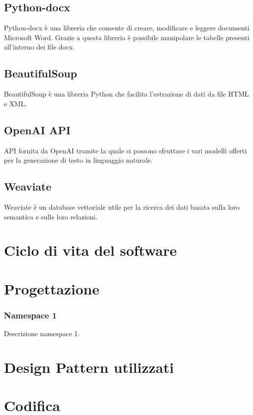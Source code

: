 \subsection{Python-docx}
Python-docx è una libreria che consente di creare, modificare e leggere documenti Microsoft Word.
Grazie a questa libreria è possibile manipolare le tabelle presenti all'interno dei file docx.
\subsection{BeautifulSoup}
BeautifulSoup è una libreria Python che facilita l'estrazione di dati da file HTML e XML.
\subsection{OpenAI API}
API fornita da OpenAI tramite la quale si possono sfruttare i vari modelli offerti per la generazione di testo in linguaggio naturale.
\subsection{Weaviate}
\label{subsec:weav}
Weaviate è un database vettoriale utile per la ricerca dei dati basata sulla loro semantica e sulle loro relazioni. 

\section{Ciclo di vita del software}
\label{sec:ciclo-vita-software}

\section{Progettazione}
\label{sec:progettazione}

\subsubsection{Namespace 1} %
Descrizione namespace 1.

\begin{namespacedesc}
\end{namespacedesc}


\section{Design Pattern utilizzati}

\section{Codifica}
